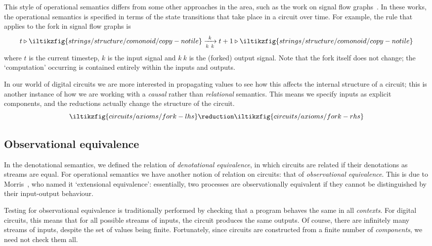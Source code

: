 \documentclass{lmcs}
\begin{document}
\begin{rem}
    This style of operational semantics differs from some other approaches in
    the area, such as the work on signal flow graphs~\cite{bonchi2021survey}.
    In these works, the operational semantics is specified in terms of
    the state transitions that take place in a circuit over time.
    For example, the rule that applies to the fork in signal flow graphs is
    \[
        t \triangleright \iltikzfig{strings/structure/comonoid/copy-notile}
        \xrightarrow[k\ k]{k}
        t+1 \triangleright \iltikzfig{strings/structure/comonoid/copy-notile}
    \]
    where \(t\) is the current timestep, \(k\) is the input signal and
    \(k\ k\) is the (forked) output signal.
    Note that the fork itself does not change; the `computation' occurring is
    contained entirely within the inputs and outputs.

    In our world of digital circuits we are more interested in propagating
    values to see how this affects the internal structure of a circuit; this is
    another instance of how we are working with a \emph{causal} rather than
    \emph{relational} semantics.
    This means we specify inputs as explicit components, and the reductions
    actually change the structure of the circuit.
    \[
        \iltikzfig{circuits/axioms/fork-lhs}
        \reduction
        \iltikzfig{circuits/axioms/fork-rhs}
    \]
\end{rem}

\subsection{Observational equivalence}\label{sec:observational}

In the denotational semantics, we defined the relation of
\emph{denotational equivalence}, in which circuits are related if their
denotations as streams are equal.
For operational semantics we have another notion of relation on circuits: that
of \emph{observational equivalence}.
This is due to Morris~\cite{morris1969lambdacalculus}, who named it
`extensional equivalence': essentially, two processes are observationally
equivalent if they cannot be distinguished by their input-output behaviour.

Testing for observational equivalence is traditionally performed by checking
that a program behaves the same in all \emph{contexts}.
For digital circuits, this means that for all possible streams of inputs, the
circuit produces the same outputs.
Of course, there are infinitely many streams of inputs, despite the set of
values being finite.
Fortunately, since circuits are constructed from a finite number of
\emph{components}, we need not check them all.
\end{document}
